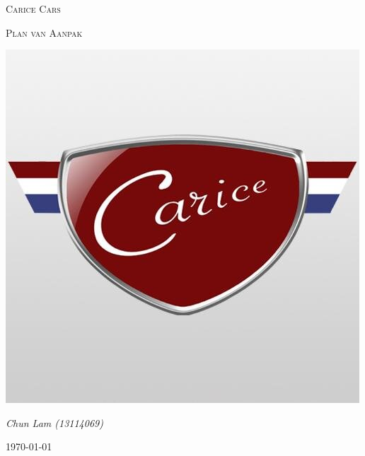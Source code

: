 \documentclass[]{report}
\begin{document}
\begin{titlepage}
\centering
\par\vspace{1cm}
{\scshape\LARGE Carice Cars \par}
\vspace{1cm}
{\scshape\Large Plan van Aanpak  \par}
\vspace{2.5cm}

\includegraphics[scale=0.5]{figures/logo.jpeg}

\vfill
{\Large\itshape Chun Lam (13114069)\par}


\vspace{1cm}
{\large \today\par}
\end{titlepage}
\newpage

%


\end{document}
